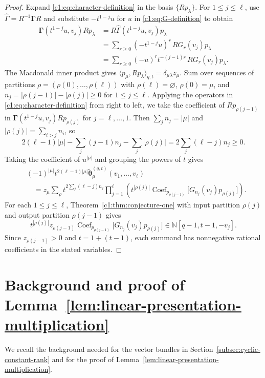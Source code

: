 \documentclass[12pt,reqno,a4paper]{amsart}
\numberwithin{equation}{section}
\numberwithin{figure}{section}
\theoremstyle{plain}
\theoremstyle{definition}
\DeclareMathOperator{\Coef}{Coef}
\begin{document}
\begin{proof}
Expand \eqref{c1:eq:character-definition} in the basis $\{Rp_\lambda\}$.
For $1\leq j\leq\ell$, use $\widehat\Gamma=R^{-1}\boldsymbol\Gamma R$
and substitute $-t^{1-j}u$ for $u$ in \eqref{c1:eq:G-definition} to obtain
\[
 \begin{aligned}
 \boldsymbol\Gamma(t^{1-j}u,v_j)Rp_\lambda
   &=R\widehat\Gamma(t^{1-j}u,v_j)p_\lambda\\
   &=\sum_{r\geq0}(-t^{1-j}u)^r\,R G_r(v_j)p_\lambda\\
   &=\sum_{r\geq0}(-u)^r t^{-(j-1)r}\,R G_r(v_j)p_\lambda .
 \end{aligned}
\]
The Macdonald inner product gives
$\langle p_\mu,Rp_\lambda\rangle_{q,t}=\delta_{\mu\lambda}z_\mu$.
Sum over sequences of partitions $\rho=(\rho(0),\ldots,\rho(\ell))$ with
$\rho(\ell)=\varnothing$, $\rho(0)=\mu$, and
$n_j=|\rho(j-1)|-|\rho(j)|\geq0$ for $1\leq j\leq\ell$.
Applying the operators in \eqref{c1:eq:character-definition} from right
to left, we take the coefficient of $Rp_{\rho(j-1)}$ in
$\boldsymbol\Gamma(t^{1-j}u,v_j)Rp_{\rho(j)}$ for $j=\ell,\ldots,1$.
Then $\sum_j n_j=|\mu|$ and $|\rho(j)|=\sum_{i>j}n_i$, so
\[
 2(\ell-1)|\mu|-\sum_j(j-1)n_j-\sum_j|\rho(j)|
 =2\sum_j(\ell-j)n_j\geq0.
\]
Taking the coefficient of $u^{|\mu|}$ and grouping the powers of $t$ gives
\[
 \begin{aligned}
 &(-1)^{|\mu|}t^{2(\ell-1)|\mu|}
   \widetilde{\boldsymbol\theta}_\mu^{(q,t)}(v_1,\ldots,v_\ell)\\
 &\quad=z_\mu\sum_{\rho}
   t^{2\sum_j(\ell-j)n_j}
   \prod_{j=1}^{\ell}\left(
      t^{|\rho(j)|}\Coef_{p_{\rho(j-1)}}
      \bigl[G_{n_j}(v_j)p_{\rho(j)}\bigr]\right).
 \end{aligned}
\]
For each $1\leq j\leq\ell$, Theorem~\ref{c1:thm:conjecture-one}
with input partition $\rho(j)$ and output partition $\rho(j-1)$ gives
\[
 t^{|\rho(j)|}z_{\rho(j-1)}\Coef_{p_{\rho(j-1)}}
 \bigl[G_{n_j}(v_j)p_{\rho(j)}\bigr]\in\mathbb N[q-1,t-1,-v_j].
\]
Since $z_{\rho(j-1)}>0$ and $t=1+(t-1)$, each summand has
nonnegative rational coefficients in the stated variables.
\end{proof}


\appendix
\section{Background and proof of Lemma~\ref{lem:linear-presentation-multiplication}}
\label{sec:appendix-lemma}

We recall the background needed for the vector bundles in
Section~\ref{subsec:cyclic-constant-rank} and for the proof of
Lemma~\ref{lem:linear-presentation-multiplication}.
\end{document}
